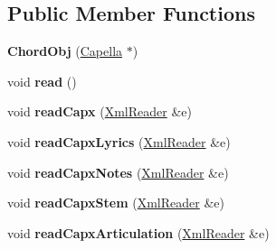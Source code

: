 \subsection*{Public Member Functions}
\begin{DoxyCompactItemize}
\item 
\mbox{\label{class_ms_1_1_chord_obj_a2b73479e58691ea08b8e253c9140efa5}} 
{\bfseries Chord\+Obj} (\hyperlink{class_ms_1_1_capella}{Capella} $\ast$)
\item 
\mbox{\label{class_ms_1_1_chord_obj_a7a24e03cbf463f55d4383ab78352dfac}} 
void {\bfseries read} ()
\item 
\mbox{\label{class_ms_1_1_chord_obj_a0349889b6c3b572b6072aa1fb665244b}} 
void {\bfseries read\+Capx} (\hyperlink{class_ms_1_1_xml_reader}{Xml\+Reader} \&e)
\item 
\mbox{\label{class_ms_1_1_chord_obj_ad50297a2fd9d258da4187f5534a6c14e}} 
void {\bfseries read\+Capx\+Lyrics} (\hyperlink{class_ms_1_1_xml_reader}{Xml\+Reader} \&e)
\item 
\mbox{\label{class_ms_1_1_chord_obj_a87399ef15c4218f2814beffbda6937f8}} 
void {\bfseries read\+Capx\+Notes} (\hyperlink{class_ms_1_1_xml_reader}{Xml\+Reader} \&e)
\item 
\mbox{\label{class_ms_1_1_chord_obj_a04019704b1c81cff24663443ac5e0bd8}} 
void {\bfseries read\+Capx\+Stem} (\hyperlink{class_ms_1_1_xml_reader}{Xml\+Reader} \&e)
\item 
\mbox{\label{class_ms_1_1_chord_obj_a5858868fe6381323f4511c98f70def8c}} 
void {\bfseries read\+Capx\+Articulation} (\hyperlink{class_ms_1_1_xml_reader}{Xml\+Reader} \&e)
\end{DoxyCompactItemize}
